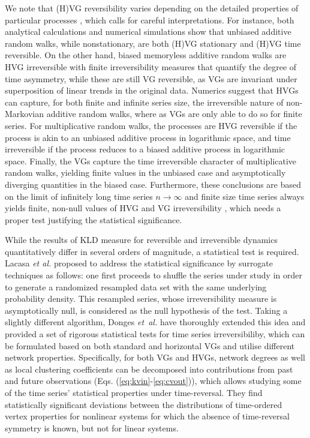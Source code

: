 		We note that (H)VG reversibility varies depending on the detailed properties of particular processes \cite{Lacasa2015}, which calls for careful interpretations. For instance, both analytical calculations and numerical simulations show that unbiased additive random walks, while nonstationary, are both (H)VG  stationary and (H)VG time reversible. On the other hand, biased memoryless additive random walks are HVG irreversible with finite irreversibility measures that quantify the degree of time asymmetry, while these are still VG reversible, as VGs are invariant under superposition of linear trends in the original data. Numerics suggest that HVGs can capture, for both finite and infinite series size, the irreversible nature of non-Markovian additive random walks, where as VGs are only able to do so for finite series. For multiplicative random walks, the processes are HVG reversible if the process is akin to an unbiased additive process in logarithmic space, and time irreversible if the process reduces to a biased additive process in logarithmic space. Finally, the VGs capture the time irreversible character of multiplicative random walks, yielding finite values in the unbiased case and asymptotically diverging quantities in the biased case. Furthermore, these conclusions are based on the limit of infinitely long time series $n \to \infty$ and finite size time series always yields finite, non-null values of HVG and VG irreversibility \cite{Xiong2018}, which needs a proper test justifying the statistical significance. 
		
		While the results of KLD measure for reversible and irreversible dynamics quantitatively differ in several orders of magnitude, a statistical test is required. Lacasa \textit{et al.} proposed to address the statistical significance by surrogate techniques as follows: one first proceeds to shuffle the series under study in order to generate a randomized resampled data set with the same underlying probability density. This resampled series, whose irreversibility measure is asymptotically null, is considered as the null hypothesis of the test. Taking a slightly different algorithm, Donges \textit{et~al.} \cite{Donges2013} have thoroughly extended this idea and provided a set of rigorous statistical tests for time series irreversibiliby, which can be formulated based on both standard and horizontal VGs and utilise different network properties. Specifically, for both VGs and HVGs, network degrees as well as local clustering coefficients can be decomposed into contributions from past and future observations (Eqs. (\ref{eq:kvin}-\ref{eq:cvout})), which allows studying some of the time series' statistical properties under time-reversal. They find statistically significant deviations between the distributions of time-ordered vertex properties for nonlinear systems for which the absence of time-reversal symmetry is known, but not for linear systems. 
		
